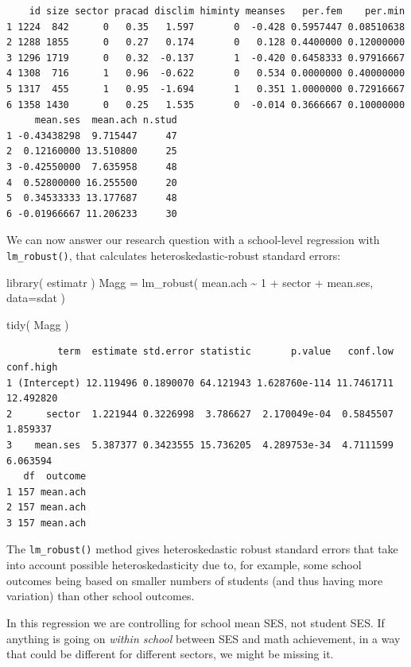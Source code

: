 \documentclass[
  letterpaper,
  DIV=11,
  numbers=noendperiod]{scrreprt}
\newenvironment{Shaded}{}{}
\newcommand{\AttributeTok}[1]{\textcolor[rgb]{0.49,0.56,0.16}{#1}}
\newcommand{\DecValTok}[1]{\textcolor[rgb]{0.25,0.63,0.44}{#1}}
\newcommand{\FunctionTok}[1]{\textcolor[rgb]{0.02,0.16,0.49}{#1}}
\newcommand{\NormalTok}[1]{#1}
\newcommand{\OtherTok}[1]{\textcolor[rgb]{0.00,0.44,0.13}{#1}}
\newcommand{\SpecialCharTok}[1]{\textcolor[rgb]{0.25,0.44,0.63}{#1}}
\begin{document}
\begin{verbatim}
    id size sector pracad disclim himinty meanses   per.fem    per.min
1 1224  842      0   0.35   1.597       0  -0.428 0.5957447 0.08510638
2 1288 1855      0   0.27   0.174       0   0.128 0.4400000 0.12000000
3 1296 1719      0   0.32  -0.137       1  -0.420 0.6458333 0.97916667
4 1308  716      1   0.96  -0.622       0   0.534 0.0000000 0.40000000
5 1317  455      1   0.95  -1.694       1   0.351 1.0000000 0.72916667
6 1358 1430      0   0.25   1.535       0  -0.014 0.3666667 0.10000000
     mean.ses  mean.ach n.stud
1 -0.43438298  9.715447     47
2  0.12160000 13.510800     25
3 -0.42550000  7.635958     48
4  0.52800000 16.255500     20
5  0.34533333 13.177687     48
6 -0.01966667 11.206233     30
\end{verbatim}

We can now answer our research question with a school-level regression
with \texttt{lm\_robust()}, that calculates heteroskedastic-robust
standard errors:

\begin{Shaded}
\begin{Highlighting}[]
\FunctionTok{library}\NormalTok{( estimatr )}
\NormalTok{Magg }\OtherTok{=} \FunctionTok{lm\_robust}\NormalTok{( mean.ach }\SpecialCharTok{\textasciitilde{}} \DecValTok{1} \SpecialCharTok{+}\NormalTok{ sector }\SpecialCharTok{+}\NormalTok{ mean.ses, }\AttributeTok{data=}\NormalTok{sdat )}

\FunctionTok{tidy}\NormalTok{( Magg )}
\end{Highlighting}
\end{Shaded}

\begin{verbatim}
         term  estimate std.error statistic       p.value   conf.low conf.high
1 (Intercept) 12.119496 0.1890070 64.121943 1.628760e-114 11.7461711 12.492820
2      sector  1.221944 0.3226998  3.786627  2.170049e-04  0.5845507  1.859337
3    mean.ses  5.387377 0.3423555 15.736205  4.289753e-34  4.7111599  6.063594
   df  outcome
1 157 mean.ach
2 157 mean.ach
3 157 mean.ach
\end{verbatim}

The \texttt{lm\_robust()} method gives heteroskedastic robust standard
errors that take into account possible heteroskedasticity due to, for
example, some school outcomes being based on smaller numbers of students
(and thus having more variation) than other school outcomes.

In this regression we are controlling for school mean SES, not student
SES. If anything is going on \emph{within school} between SES and math
achievement, in a way that could be different for different sectors, we
might be missing it.
\end{document}
